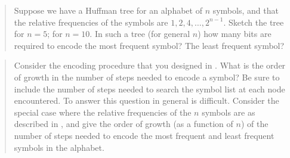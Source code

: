 \begin{quote}
 Suppose we have a Huffman tree
for an alphabet of \( n \) symbols, and that the relative frequencies of the
symbols are \( 1, 2, 4, \dots, 2^{n-1} \).  Sketch the tree for \( n=5 \); for
\( n=10 \).  In such a tree (for general \( n \)) how many bits are required to
encode the most frequent symbol?  The least frequent symbol?
\end{quote}

\begin{quote}
 Consider the encoding procedure
that you designed in .  What is the order of growth in the
number of steps needed to encode a symbol?  Be sure to include the number of
steps needed to search the symbol list at each node encountered.  To answer
this question in general is difficult.  Consider the special case where the
relative frequencies of the \( n \) symbols are as described in ,
and give the order of growth (as a function of \( n \)) of the number of
steps needed to encode the most frequent and least frequent symbols in the
alphabet.
\end{quote}
